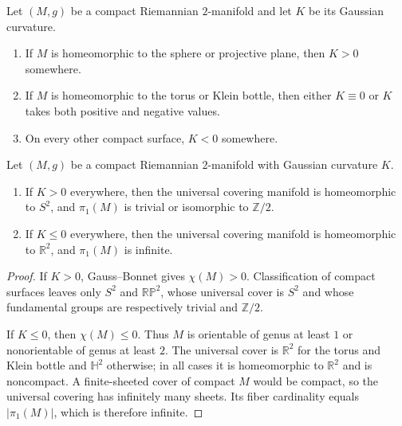 \begin{corollary}
\label{cor:gaussian-curvature-and-topology}
Let $(M,g)$ be a compact Riemannian $2$-manifold and let $K$ be its Gaussian
curvature.
\begin{enumerate}
\item[(a)] If $M$ is homeomorphic to the sphere or projective plane, then
$K>0$ somewhere.
\item[(b)] If $M$ is homeomorphic to the torus or Klein bottle, then either
$K\equiv0$ or $K$ takes both positive and negative values.
\item[(c)] On every other compact surface, $K<0$ somewhere.
\end{enumerate}
\end{corollary}

\begin{corollary}
\label{cor:curvature-determines-cover}
Let $(M,g)$ be a compact Riemannian $2$-manifold with Gaussian curvature $K$.
\begin{enumerate}
\item[(a)] If $K>0$ everywhere, then the universal covering manifold is
homeomorphic to $S^2$, and $\pi_1(M)$ is trivial or isomorphic to
$\mathbb Z/2$.
\item[(b)] If $K\leq0$ everywhere, then the universal covering manifold is
homeomorphic to $\mathbb R^2$, and $\pi_1(M)$ is infinite.
\end{enumerate}
\end{corollary}

\begin{proof}
\sketch If $K>0$, Gauss--Bonnet gives $\chi(M)>0$. Classification of compact
surfaces leaves only $S^2$ and $\mathbb{RP}^2$, whose universal cover is
$S^2$ and whose fundamental groups are respectively trivial and
$\mathbb Z/2$.

If $K\leq0$, then $\chi(M)\leq0$. Thus $M$ is orientable of genus at least
$1$ or nonorientable of genus at least $2$. The universal cover is
$\mathbb R^2$ for the torus and Klein bottle and $\mathbb H^2$ otherwise; in
all cases it is homeomorphic to $\mathbb R^2$ and is noncompact. A finite-sheeted
cover of compact $M$ would be compact, so the universal covering has infinitely
many sheets. Its fiber cardinality equals $|\pi_1(M)|$, which is therefore
infinite.
\end{proof}


